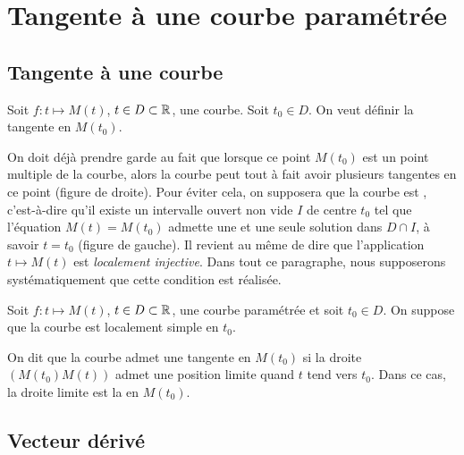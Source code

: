 \documentclass[class=report,crop=false]{standalone}
\begin{document}
\section{Tangente à une courbe paramétrée}


\subsection{Tangente à une courbe}

Soit $f : t\mapsto M(t)$, $t\in D\subset\mathbb{R}$, une courbe.
Soit $t_0\in D$. On veut définir la tangente en $M(t_0)$.



On doit déjà prendre garde au fait que lorsque ce point $M(t_0)$ est un point multiple de la courbe,
alors la courbe peut tout à fait avoir plusieurs tangentes en ce point (figure de droite).
Pour éviter cela, on supposera que la courbe est
, c'est-à-dire qu'il existe un intervalle
ouvert non vide $I$ de centre $t_0$ tel que l'équation $M(t)=M(t_0)$
admette une et une seule solution dans $D\cap I$, à savoir $t=t_0$ (figure de gauche). Il
revient au même de dire que l'application $t\mapsto M(t)$ est
\emph{localement injective}. Dans tout ce paragraphe, nous supposerons
systématiquement que cette condition est réalisée.


\bigskip

Soit $f : t\mapsto M(t)$, $t\in D\subset\mathbb{R}$, une courbe paramétrée et
soit $t_0\in D$. On suppose que la courbe est localement simple en $t_0$.
\begin{definition}[Tangente]
On dit que la courbe admet une tangente en $M(t_0)$ si la droite $(M(t_0)M(t))$
admet une position limite quand $t$ tend vers $t_0$. Dans ce cas,
la droite limite est la  en $M(t_0)$.
\end{definition}


\subsection{Vecteur dérivé}
\end{document}
